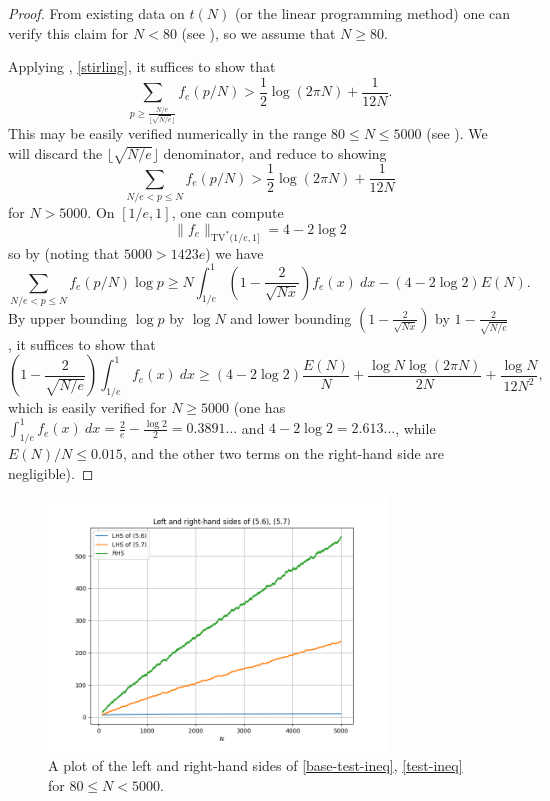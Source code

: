 \documentclass[12pt,a4paper,reqno]{amsart}
\numberwithin{equation}{section}
\theoremstyle{plain}
\theoremstyle{definition}
\begin{document}
\begin{proof}  From existing data on $t(N)$ (or the linear programming method) one can verify this claim for $N < 80$ (see ), so we assume that $N\geq 80$.
  
Applying , \eqref{stirling}, it suffices to show that
\begin{equation}\label{base-test-ineq}
   \sum_{p \geq \frac{N/e}{\lfloor\sqrt{N/e}\rfloor}} f_{e}(p/N) > \frac{1}{2} \log(2\pi N) + \frac{1}{12N}.
\end{equation}
This may be easily verified numerically in the range $80 \leq N \leq 5000$ (see ).
We will discard the $\lfloor\sqrt{N/e}\rfloor$ denominator, and reduce to showing
\begin{equation}\label{test-ineq}
  \sum_{N/e < p \leq N} f_{e}(p/N) > \frac{1}{2} \log(2\pi N) + \frac{1}{12N}
\end{equation}
for $N > 5000$.  On $[1/e,1]$, one can compute
$$ \|f_e\|_{\mathrm{TV}^*(1/e,1]}
= 4 - 2 \log 2$$
so by  (noting that $5000 > 1423e$) we have
$$ \sum_{N/e < p \leq N} f_{e}(p/N) \log p
\geq N \int_{1/e}^1 \left(1-\frac{2}{\sqrt{Nx}}\right) f_e(x)\ dx - (4 - 2 \log 2) E(N).
$$
By upper bounding $\log p$ by $\log N$ and lower bounding $\left(1-\frac{2}{\sqrt{Nx}}\right)$ by $1 - \frac{2}{\sqrt{N/e}}$, it suffices to show that
$$ \left(1 - \frac{2}{\sqrt{N/e}}\right) \int_{1/e}^1 f_e(x)\ dx \geq
(4 - 2 \log 2) \frac{E(N)}{N}
+ \frac{\log N \log(2\pi N)}{2N} + \frac{\log N}{12N^2},$$
which is easily verified for $N \geq 5000$ (one has $\int_{1/e}^1 f_e(x)\ dx = \frac{2}{e}-\frac{\log 2}{2}=0.3891\dots$ and $4-2\log 2 = 2.613\dots$, while $E(N)/N \leq 0.015$, and the other two terms on the right-hand side are negligible).
\end{proof}

\begin{figure}
  \centering
  \includegraphics[width=0.8\textwidth]{lhs_rhs.png}
  \caption{A plot of the left and right-hand sides of \eqref{base-test-ineq}, \eqref{test-ineq} for $80 \leq N < 5000$.}\label{fig2}
\end{figure}
\end{document}
